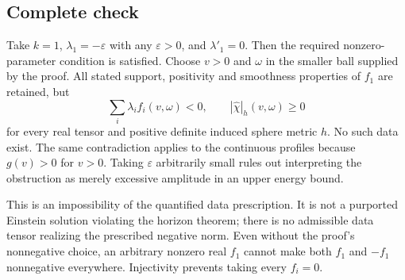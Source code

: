 \documentclass[10pt]{article}
\begin{document}
\subsection*{Complete check}
Take \(k=1\), \(\lambda_1=-\varepsilon\) with any \(\varepsilon>0\), and \(\lambda'_1=0\). Then the required nonzero-parameter condition is satisfied. Choose \(v>0\) and \(\omega\) in the smaller ball supplied by the proof. All stated support, positivity and smoothness properties of \(f_1\) are retained, but \[\sum_i\lambda_i f_i(v,\omega)<0,\qquad
 |\widehat\chi|_h(v,\omega)\ge0\] for every real tensor and positive definite induced sphere metric \(h\). No such data exist. The same contradiction applies to the continuous profiles because \(g(v)>0\) for \(v>0\). Taking \(\varepsilon\) arbitrarily small rules out interpreting the obstruction as merely excessive amplitude in an upper energy bound.\par
This is an impossibility of the quantified data prescription. It is not a purported Einstein solution violating the horizon theorem; there is no admissible data tensor realizing the prescribed negative norm. Even without the proof’s nonnegative choice, an arbitrary nonzero real \(f_1\) cannot make both \(f_1\) and \(-f_1\) nonnegative everywhere. Injectivity prevents taking every \(f_i=0\).\par
\end{document}
